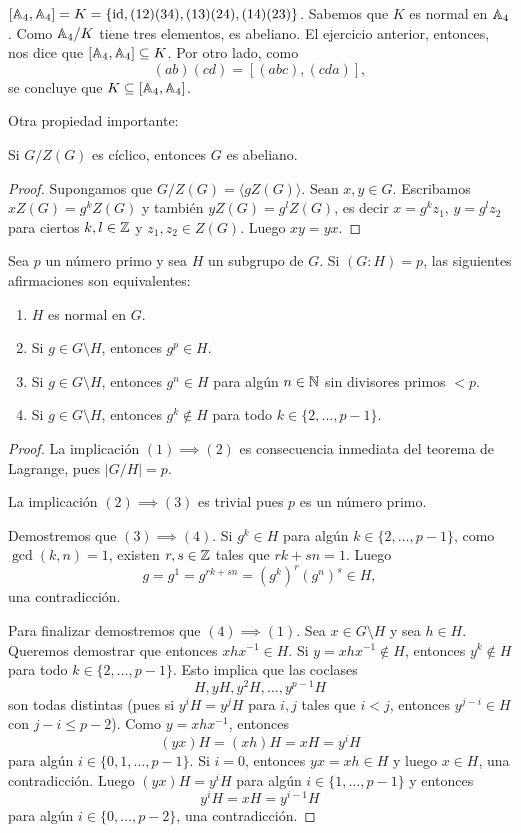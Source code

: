\begin{example}
$[\mathbb{A}_4,\mathbb{A}_4]=K=\{\operatorname{id},(12)(34),(13)(24),(14)(23)\}$. 
Sabemos que $K$ es normal en $\mathbb{A}_4$. Como $\mathbb{A}_4/K$ tiene tres elementos, es abeliano. El ejercicio anterior, entonces, 
nos dice que $[\mathbb{A}_4,\mathbb{A}_4]\subseteq K$. Por otro lado, como 
\[
(ab)(cd)=[(abc),(cda)],
\]   	
se concluye que $K\subseteq[\mathbb{A}_4,\mathbb{A}_4]$. 
\end{example}

Otra propiedad importante:

\begin{proposition}
Si $G/Z(G)$ es cíclico, entonces $G$ es abeliano.
\end{proposition}

\begin{proof}
Supongamos que $G/Z(G)=\langle gZ(G)\rangle$. Sean $x,y\in G$. Escribamos $xZ(G)=g^kZ(G)$ y también $yZ(G)=g^lZ(G)$, es decir
$x=g^kz_1$, $y=g^lz_2$ para ciertos $k,l\in\mathbb{Z}$ y $z_1,z_2\in Z(G)$. Luego $xy=yx$. 
\end{proof}

\begin{theorem}
Sea $p$ un número primo y sea $H$ un subgrupo de $G$. Si $(G:H)=p$, las siguientes afirmaciones son equivalentes:
\begin{enumerate}
\item $H$ es normal en $G$.
\item Si $g\in G\setminus H$, entonces $g^p\in H$.
\item Si $g\in G\setminus H$, entonces $g^n\in H$ para algún $n\in\mathbb{N}$ sin divisores primos $<p$.
\item Si $g\in G\setminus H$, entonces $g^k\not\in H$ para todo $k\in\{2,\dots,p-1\}$. 
\end{enumerate}
\end{theorem}

\begin{proof}
	La implicación $(1)\implies(2)$ es consecuencia inmediata del teorema de Lagrange, pues $|G/H|=p$. 
	
	La implicación $(2)\implies(3)$ es trivial pues $p$ es un número primo. 
	
	Demostremos que $(3)\implies(4)$. Si $g^k\in H$ para algún $k\in\{2,\dots,p-1\}$, como $\gcd(k,n)=1$, existen $r,s\in\mathbb{Z}$ tales que
	$rk+sn=1$. Luego
	\[
	g=g^1=g^{rk+sn}=(g^k)^r(g^n)^s\in H,
	\]
	una contradicción. 
	
	Para finalizar demostremos que $(4)\implies(1)$. Sea $x\in G\setminus H$ y sea $h\in H$. Queremos demostrar que entonces $xhx^{-1}\in H$. Si $y=xhx^{-1}\not\in H$, entonces
	$y^k\not\in H$ para todo $k\in\{2,\dots,p-1\}$. Esto implica que las coclases 
	\[
	H,yH,y^2H,\dots,y^{p-1}H
	\]
	son todas distintas (pues si $y^iH=y^jH$ para $i,j$ tales que $i<j$, entonces $y^{j-i}\in H$ con $j-i\leq p-2$). Como $y=xhx^{-1}$, 
	entonces
	\[
	(yx)H=(xh)H=xH=y^iH
	\]
	para algún $i\in\{0,1,\dots,p-1\}$. Si $i=0$, entonces $yx=xh\in H$ y luego $x\in H$, una contradicción. Luego $(yx)H=y^iH$ para algún $i\in\{1,\dots,p-1\}$ y entonces
	\[
	y^iH=xH=y^{i-1}H
	\]
	para algún $i\in\{0,\dots,p-2\}$, una contradicción.  
\end{proof}

